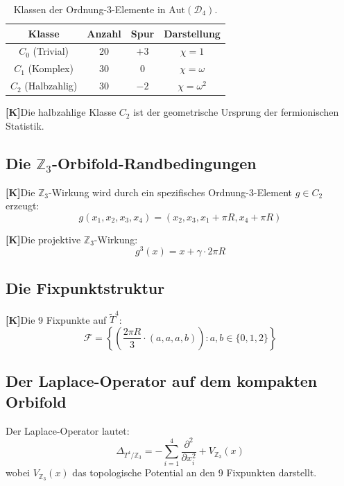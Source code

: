\documentclass[11pt,a4paper]{article}
\newcommand{\Dfour}{\mathcal{D}_4}
\newcommand{\Ffix}{\mathcal{F}}
\newcommand{\Kstatus}{\textbf{[K]}}
\begin{document}
	\begin{table}[h!]
		\centering
		\caption{Klassen der Ordnung-3-Elemente in $\text{Aut}(\Dfour)$.}
		\label{tab:order3}
		\begin{tabular}{c c c c}
			\toprule
			\textbf{Klasse} & \textbf{Anzahl} & \textbf{Spur} & \textbf{Darstellung} \\
			\midrule
			$C_0$ (Trivial) & 20 & $+3$ & $\chi = 1$ \\
			$C_1$ (Komplex) & 30 & $0$ & $\chi = \omega$ \\
			$C_2$ (Halbzahlig) & 30 & $-2$ & $\chi = \omega^2$ \\
			\bottomrule
		\end{tabular}
	\end{table}
	
	\Kstatus Die halbzahlige Klasse $C_2$ ist der geometrische Ursprung der fermionischen Statistik.
	
	\subsection{Die $\mathbb{Z}_3$-Orbifold-Randbedingungen}
	
	\Kstatus Die $\mathbb{Z}_3$-Wirkung wird durch ein spezifisches Ordnung-3-Element $g \in C_2$ erzeugt:
	\begin{equation}
		g(x_1, x_2, x_3, x_4) = (x_2, x_3, x_1 + \pi R, x_4 + \pi R)
	\end{equation}
	
	\Kstatus Die projektive $\mathbb{Z}_3$-Wirkung:
	\begin{equation}
		g^3(x) = x + \gamma \cdot 2\pi R
	\end{equation}
	
	\subsection{Die Fixpunktstruktur}
	
	\Kstatus Die 9 Fixpunkte auf $\tilde{T}^4$:
	\begin{equation}
		\Ffix = \left\{ \left( \frac{2\pi R}{3} \cdot (a, a, a, b) \right) : a, b \in \{0, 1, 2\} \right\}
	\end{equation}
	
	\subsection{Der Laplace-Operator auf dem kompakten Orbifold}
	
	Der Laplace-Operator lautet:
	\begin{equation}
		\Delta_{T^4/\mathbb{Z}_3} = -\sum_{i=1}^4 \frac{\partial^2}{\partial x_i^2} + V_{\mathbb{Z}_3}(x)
	\end{equation}
	wobei $V_{\mathbb{Z}_3}(x)$ das topologische Potential an den 9 Fixpunkten darstellt.
	
\end{document}
